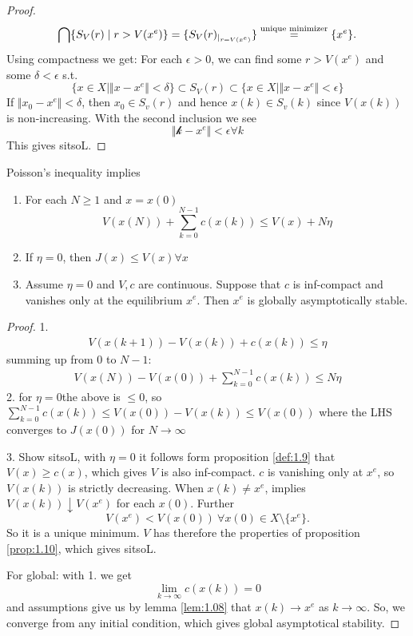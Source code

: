 \begin{proof}
    \[\bigcap \{S_V(r)\mid r>V(x^e)\}=\{S_V(r)_{|_{r=V(x^e)}}\}\stackrel{\text{unique minimizer}}{=}\{x^e\}.\]
    Using compactness we get: For each \(\epsilon>0\), we can find some \(r>V(x^e)\)
    and some \(\delta<\epsilon\) s.t. 
    \[\{x\in X\mid \Vert x-x^e\Vert < \delta\}\subset S_V(r)\subset \{x\in X\mid \Vert x-x^e\Vert < \epsilon\}\]
    If \(\Vert x_0-x^e\Vert<\delta\), then \(x_0\in S_v(r)\) and hence \(x(k)\in S_v(k)\)
    since \(V(x(k))\) is non-increasing. With the second inclusion we see 
    \[\Vert \mathcal{k}-x^e\Vert<\epsilon\forall k\]
    This gives sitsoL.
\end{proof}

\begin{proposition}\label{prop:1.11}
    Poisson's inequality implies 
    \begin{enumerate}
        \item For each \(N\geq 1\) and \(x=x(0)\) \[V(x(N))+\sum_{k=0}^{N-1}c(x(k))\leq V(x)+ N\eta\]
        \item If \(\eta=0\), then \(J(x)\leq V(x)\forall x\)
        \item Assume \(\eta=0\) and \(V,c\) are continuous. Suppose that \(c\) is inf-compact and vanishes only at the equilibrium \(x^e\). Then 
              \(x^e\) is globally asymptotically stable.  
    \end{enumerate}
\end{proposition}

\begin{proof}
    1. \begin{align*}
        V(x(k+1))-V(x(k))+c(x(k))\leq \eta 
    \end{align*}
    summing up from \(0\) to \(N-1\):
    \begin{align*}
        V(x(N))-V(x(0))+\sum_{k=0}^{N-1}c(x(k))\leq N\eta
    \end{align*}
    2. for \(\eta=0\)the above is \(\leq 0\), so \(\sum_{k=0}^{N-1}c(x(k))\leq V(x(0))-V(x(k))\leq V(x(0))\)
    where the LHS converges to \(J(x(0))\) for \(N\to\infty\) 

    3. Show sitsoL,  with \(\eta=0\) it follows form proposition \ref{def:1.9} that \(V(x)\geq c(x)\), which gives \(V\) is 
    also inf-compact. 
    \(c\) is vanishing only at \(x^e\), so \(V(x(k))\) is strictly decreasing. When \(x(k)\neq x^e\),
    implies \(V(x(k))\downarrow V(x^e)\) for each \(x(0)\). Further
    \[V(x^e)<V(x(0))\ \forall x(0)\in X\setminus\{x^e\}.\] 
    So it is a unique minimum. \(V\) has therefore the properties of proposition \ref{prop:1.10}, which gives sitsoL. 

    For global: with 1. we get \[\lim_{k\to\infty}c(x(k))=0\]
    and assumptions give us by lemma \ref{lem:1.08} that \(x(k)\to x^e\) as \(k\to\infty\).
    So, we converge from any initial condition, which gives global asymptotical stability.

\end{proof}


